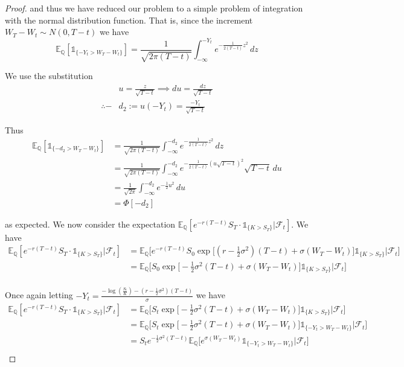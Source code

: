 \documentclass[12pt]{article}
\begin{document}
\begin{proof}
and thus we have reduced our problem to a simple problem of integration with the normal distribution function. That is, since the increment $W_T - W_t \sim N(0,T - t)$ we have
\begin{equation*}
	\mathbb E_{\mathbb Q}[\mathds 1_{\{-Y_t > W_T - W_t\}}] = \frac{1}{\sqrt{2\pi(T - t)}}\int^{-Y_t}_{-\infty} e^{-\frac{1}{2(T - t)}z^2}\,dz
\end{equation*}

We use the substitution
\begin{align*}
	&u = \frac{z}{\sqrt{T - t}} \implies du = \frac{dz}{\sqrt{T - t}} \\
	\therefore -&d_2 := u(-Y_t) = \frac{-Y_t}{\sqrt{T - t}}
\end{align*}

Thus
\begin{align*}
	\mathbb E_{\mathbb Q}[\mathds 1_{\{-d_2 > W_T - W_t\}}] &= \frac{1}{\sqrt{2\pi(T - t)}}\int^{-d_2}_{-\infty} e^{-\frac{1}{2(T - t)}z^2}\,dz \\
	&= \frac{1}{\sqrt{2\pi(T - t)}}\int^{-d_2}_{-\infty} e^{-\frac{1}{2(T - t)}(u\sqrt{T - t})^2}\sqrt{T - t}\,du \\
	&= \frac{1}{\sqrt{2\pi}}\int^{-d_2}_{-\infty} e^{-\frac{1}{2}u^2}\,du \\
	&= \Phi[-d_2]
\end{align*}

as expected. We now consider the expectation $\mathbb E_{\mathbb Q}[ e^{-r(T - t)} S_T \cdot \mathds 1_{\{K > S_T\}}| \mathcal F_t]$. We have
\begin{align*}
	\mathbb E_{\mathbb Q}[ e^{-r(T - t)} S_T \cdot \mathds 1_{\{K > S_T\}}| \mathcal F_t] &= \mathbb E_{\mathbb Q}\bigg[ e^{-r(T - t)} S_0 \exp{\big[(r - \frac{1}{2}\sigma^2)(T - t) + \sigma(W_T - W_t)\big]} \mathds 1_{\{K > S_T\}} \bigg|\mathcal F_t\bigg] \\
	&= \mathbb E_{\mathbb Q}\bigg[S_0 \exp{\big[-\frac{1}{2}\sigma^2(T - t) + \sigma(W_T - W_t)\big]} \mathds 1_{\{K > S_T\}} \bigg| \mathcal F_t\bigg] \\
\end{align*}

Once again letting $-Y_t = \frac{-\log(\frac{S_t}{K}) - (r - \frac{1}{2}\sigma^2)(T - t)}{\sigma}$ we have
\begin{align*}
	\mathbb E_{\mathbb Q}[ e^{-r(T - t)} S_T \cdot \mathds 1_{\{K > S_T\}}| \mathcal F_t] &= \mathbb E_{\mathbb Q}\bigg[S_t \exp{\big[-\frac{1}{2}\sigma^2(T - t) + \sigma(W_T - W_t)\big]} \mathds 1_{\{K > S_T\}} \bigg| \mathcal F_t\bigg] \\
	&= \mathbb E_{\mathbb Q}\bigg[S_t \exp{\big[-\frac{1}{2}\sigma^2(T - t) + \sigma(W_T - W_t)\big]} \mathds 1_{\{-Y_t > W_T - W_t\}} \bigg| \mathcal F_t\bigg] \\
	&= S_te^{-\frac{1}{2}\sigma^2(T - t)} \mathbb E_{\mathbb Q}\bigg[e^{\sigma(W_T - W_t)}\mathds 1_{\{-Y_t > W_T - W_t\}} \bigg| \mathcal F_t \bigg] \\
\end{align*}


\end{proof}
\end{document}

